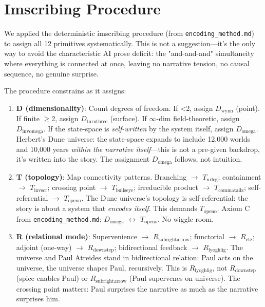 \documentclass[12pt,a4paper]{article}
\begin{document}
\section{Imscribing Procedure}

We applied the deterministic imscribing procedure (from \texttt{encoding\_method.md}) to assign all 12 primitives systematically. This is not a suggestion---it's the only way to avoid the characteristic AI prose deficit: the "and-and-and" simultaneity where everything is connected at once, leaving no narrative tension, no causal sequence, no genuine surprise.

The procedure constrains as it assigns:

\begin{enumerate}
    \item \textbf{D (dimensionality)}: Count degrees of freedom. If \textless{}2, assign $D_{\text{wynn}}$ (point). If finite $\geq$2, assign $D_{\text{turnthree}}$ (surface). If $\infty$-dim field-theoretic, assign $D_{\text{invomega}}$. If the state-space is \emph{self-written} by the system itself, assign $D_{\text{omega}}$. Herbert's Dune universe: the state-space expands to include 12,000 worlds and 10,000 years \emph{within the narrative itself}---this is not a pre-given backdrop, it's written into the story. The assignment $D_{\text{omega}}$ follows, not intuition.
    \item \textbf{T (topology)}: Map connectivity patterns. Branching $\rightarrow$ $T_{\text{nrleg}}$; containment $\rightarrow$ $T_{\text{invscr}}$; crossing point $\rightarrow$ $T_{\text{bullseye}}$; irreducible product $\rightarrow$ $T_{\text{commatailz}}$; self-referential $\rightarrow$ $T_{\text{openo}}$. The Dune universe's topology is self-referential: the story is about a system that \emph{encodes itself}. This demands $T_{\text{openo}}$. Axiom C from \texttt{encoding\_method.md}: $D_{\text{omega}}$ $\leftrightarrow$ $T_{\text{openo}}$. No wiggle room.
    \item \textbf{R (relational mode)}: Supervenience $\rightarrow$ $R_{\text{subrightarrow}}$; functorial $\rightarrow$ $R_{\text{ctz}}$; adjoint (one-way) $\rightarrow$ $R_{\text{downstep}}$; bidirectional feedback $\rightarrow$ $R_{\text{lyoghlig}}$. The universe and Paul Atreides stand in bidirectional relation: Paul acts on the universe, the universe shapes Paul, recursively. This is $R_{\text{lyoghlig}}$, not $R_{\text{downstep}}$ (spice enables Paul) or $R_{\text{subrightarrow}}$ (Paul supervenes on universe). The crossing point matters: Paul surprises the narrative as much as the narrative surprises him.

\end{enumerate}
\end{document}
